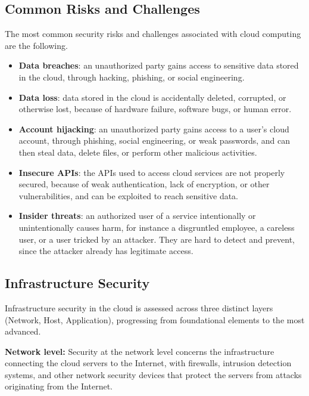 \subsection{Common Risks and Challenges}

The most common security risks and challenges associated with cloud computing are the following.

\begin{itemize}
    \item \textbf{Data breaches}: an unauthorized party gains access to sensitive data stored in the cloud, through hacking, phishing, or social engineering.
    \item \textbf{Data loss}: data stored in the cloud is accidentally deleted, corrupted, or otherwise lost, because of hardware failure, software bugs, or human error.
    \item \textbf{Account hijacking}: an unauthorized party gains access to a user's cloud account, through phishing, social engineering, or weak passwords, and can then steal data, delete files, or perform other malicious activities.
    \item \textbf{Insecure APIs}: the APIs used to access cloud services are not properly secured, because of weak authentication, lack of encryption, or other vulnerabilities, and can be exploited to reach sensitive data.
    \item \textbf{Insider threats}: an authorized user of a service intentionally or unintentionally causes harm, for instance a disgruntled employee, a careless user, or a user tricked by an attacker. They are hard to detect and prevent, since the attacker already has legitimate access.
\end{itemize}

\subsection{Infrastructure Security}

Infrastructure security in the cloud is assessed across three distinct layers (Network, Host, Application), progressing from foundational elements to the most advanced.

\textbf{Network level:} Security at the network level concerns the infrastructure connecting the cloud servers to the Internet, with firewalls, intrusion detection systems, and other network security devices that protect the servers from attacks originating from the Internet. 

\smallskip

